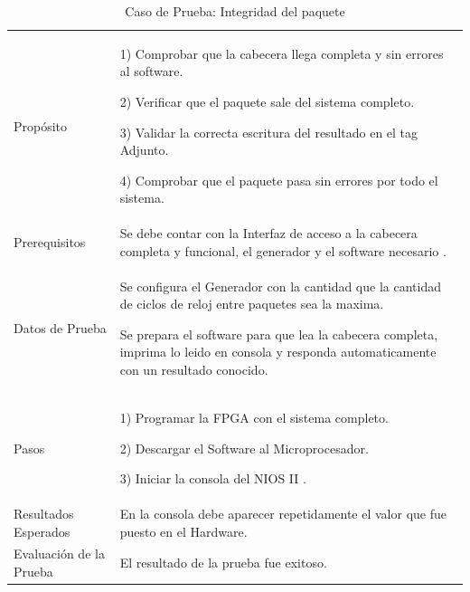 \begin{table}
	\begin{tabular}{|>{\columncolor[gray]{0.8}}l|p{9cm}|} \hline
\multicolumn{2}{|>{\columncolor[gray]{0.8}}l|}{\textbf{Caso de Prueba: Integridad del paquete }}\\ \hline
Propósito  & 1) Comprobar que la cabecera llega completa y sin errores al software. 

2) Verificar que el paquete sale del sistema completo.

3) Validar la correcta escritura del resultado en el tag Adjunto.

4) Comprobar que el paquete pasa sin errores por todo el sistema. 
\\ \hline
 Prerequisitos  & Se debe contar con la Interfaz de acceso a la cabecera completa y funcional, el generador y el software necesario .\\ \hline
 Datos de Prueba & Se configura el Generador con la cantidad que la cantidad de ciclos de reloj entre paquetes sea la maxima. 

Se prepara el software para que lea la cabecera completa, imprima lo leido en consola y responda automaticamente con un resultado conocido. 
 \\ \hline
 Pasos & 1) Programar la FPGA con el sistema completo.

2) Descargar el Software al Microprocesador.

3) Iniciar la consola del NIOS II .
\\ \hline
 Resultados Esperados & En la consola debe aparecer repetidamente el valor que fue puesto en el Hardware. \\ \hline
 Evaluación de la Prueba  & El resultado de la prueba fue exitoso.\\ \hline
	\end{tabular}
	\caption{Caso de Prueba: Integridad del paquete}
	\label{tab:testsoc}
\end{table}

